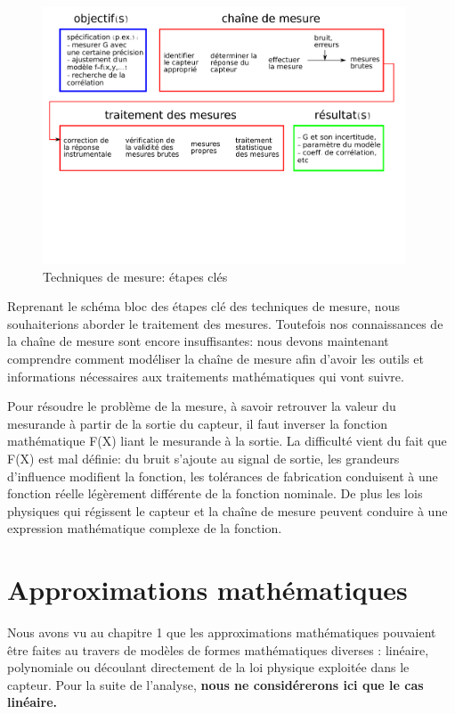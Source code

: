 \begin{figure}[h]
   \centering
   \includegraphics[width=0.96\textwidth]{assets/figures/flowChartTechMes.pdf}
   \caption{Techniques de mesure: étapes clés}
   \label{fig:flowChartTechMes}
\end{figure}

Reprenant le schéma bloc des étapes clé des techniques de mesure, nous souhaiterions aborder le traitement des mesures. Toutefois nos connaissances de la chaîne de mesure sont encore insuffisantes: nous devons maintenant comprendre comment modéliser la chaîne de mesure afin d'avoir les outils et informations nécessaires aux traitements mathématiques qui vont suivre.

Pour résoudre le problème de la mesure, à savoir retrouver la valeur du mesurande à partir de la sortie du capteur, il faut inverser la fonction mathématique F(X) liant le mesurande à la sortie. La difficulté vient du fait que F(X) est mal définie: du bruit s'ajoute au signal de sortie, les grandeurs d'influence modifient la fonction, les tolérances de fabrication conduisent à une fonction réelle légèrement différente de la fonction nominale. De plus les lois physiques qui régissent le capteur et la chaîne de mesure peuvent conduire à une expression mathématique complexe de la fonction.

\section{Approximations mathématiques}

Nous avons vu au chapitre 1 que les approximations mathématiques pouvaient être faites au travers de modèles de formes mathématiques diverses : linéaire, polynomiale ou découlant directement de la loi physique exploitée dans le capteur. Pour la suite de l'analyse, \textbf{nous ne considérerons ici que le cas linéaire.}

